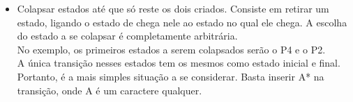 \documentclass[a4paper,10pt]{article} %
\begin{document}
\begin{itemize}
\begin{center}
\begin{figure}[!htb]
                 \end{figure}
            \end{center}
        \item Colapsar estados até que só reste os dois criados. Consiste em retirar um estado, ligando o estado de chega nele ao estado no qual ele chega. A escolha do estado a se colapsar é completamente arbitrária.\\No exemplo, os primeiros estados a serem colapsados serão o P4 e o P2.\\A única transição nesses estados tem os mesmos como estado inicial e final. Portanto, é a mais simples situação a se considerar. Basta inserir A* na transição, onde A é um caractere qualquer.

    \end{itemize}
\end{document}
